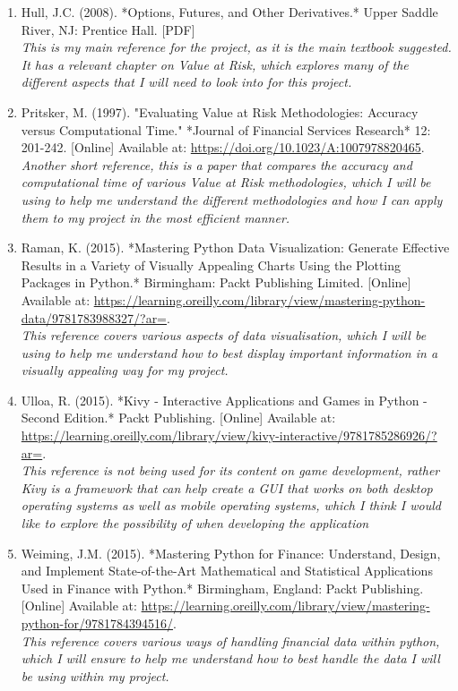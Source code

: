 \documentclass{article}
\begin{document}
\begin{small}
\begin{enumerate}
  \item\label{ref6} Hull, J.C. (2008). *Options, Futures, and Other Derivatives.* Upper Saddle River, NJ: Prentice Hall. [PDF]
  \\\textit{This is my main reference for the project, as it is the main textbook suggested. It has a relevant chapter on Value at Risk, which explores many of the different aspects that I will need to look into for this project.}

  \item\label{ref7} Pritsker, M. (1997). "Evaluating Value at Risk Methodologies: Accuracy versus Computational Time." *Journal of Financial Services Research* 12: 201-242. [Online] Available at: \url{https://doi.org/10.1023/A:1007978820465}.
  \\\textit{Another short reference, this is a paper that compares the accuracy and computational time of various Value at Risk methodologies, which I will be using to help me understand the different methodologies and how I can apply them to my project in the most efficient manner. }

  \item\label{ref8} Raman, K. (2015). *Mastering Python Data Visualization: Generate Effective Results in a Variety of Visually Appealing Charts Using the Plotting Packages in Python.* Birmingham: Packt Publishing Limited. [Online] Available at: \url{https://learning.oreilly.com/library/view/mastering-python-data/9781783988327/?ar=}.
  \\\textit{This reference covers various aspects of data visualisation, which I will be using to help me understand how to best display important information in a visually appealing way for my project.}

  \item\label{ref9} Ulloa, R. (2015). *Kivy - Interactive Applications and Games in Python - Second Edition.* Packt Publishing. [Online] Available at: \url{https://learning.oreilly.com/library/view/kivy-interactive/9781785286926/?ar=}.
  \\\textit{This reference is not being used for its content on game development, rather Kivy is a framework that can help create a GUI that works on both desktop operating systems as well as mobile operating systems, which I think I would like to explore the possibility of when developing the application}

  \item\label{ref10} Weiming, J.M. (2015). *Mastering Python for Finance: Understand, Design, and Implement State-of-the-Art Mathematical and Statistical Applications Used in Finance with Python.* Birmingham, England: Packt Publishing. [Online] Available at: \url{https://learning.oreilly.com/library/view/mastering-python-for/9781784394516/}.
  \\\textit{This reference covers various ways of handling financial data within python, which I will ensure to help me understand how to best handle the data I will be using within my project.}


\end{enumerate}
\end{small}
\end{document}
